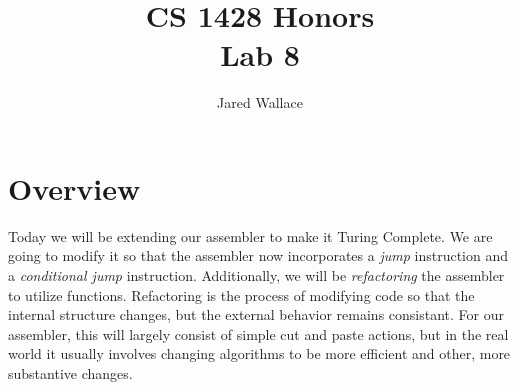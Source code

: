 \documentclass[letterpaper,12pt]{article}
\title{\Large CS 1428 Honors\\Lab 8}
\author{Jared Wallace}
\date{}
\begin{document}
\maketitle

\vspace{30mm}

\section*{Overview}
Today we will be extending our assembler to make it Turing Complete. We are going to modify it so that
the assembler now incorporates a \emph{jump} instruction and a \emph{conditional jump} instruction.
Additionally, we will be \emph{refactoring} the assembler to utilize functions. Refactoring is the
process of modifying code so that the internal structure changes, but the external behavior remains
consistant. For our assembler, this will largely consist of simple cut and paste actions, but in the
real world it usually involves changing algorithms to be more efficient and other, more substantive
changes.
\end{document}
